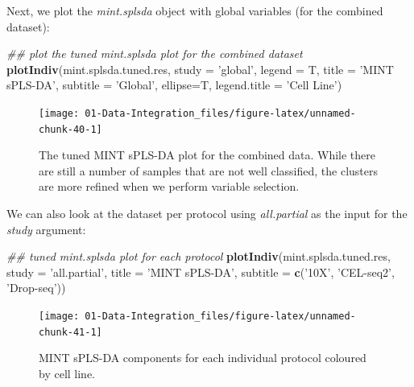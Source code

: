 \documentclass[]{book}
\newenvironment{Shaded}{\begin{snugshade}}{\end{snugshade}}
\newcommand{\CommentTok}[1]{\textcolor[rgb]{0.56,0.35,0.01}{\textit{#1}}}
\newcommand{\DataTypeTok}[1]{\textcolor[rgb]{0.13,0.29,0.53}{#1}}
\newcommand{\KeywordTok}[1]{\textcolor[rgb]{0.13,0.29,0.53}{\textbf{#1}}}
\newcommand{\NormalTok}[1]{#1}
\newcommand{\StringTok}[1]{\textcolor[rgb]{0.31,0.60,0.02}{#1}}
\theoremstyle{definition}
\theoremstyle{definition}
\theoremstyle{definition}
\theoremstyle{remark}
\begin{document}
Next, we plot the \emph{mint.splsda} object with global variables (for
the combined dataset):

\begin{Shaded}
\begin{Highlighting}[]
\CommentTok{## plot the tuned mint.splsda plot for the combined dataset}
\KeywordTok{plotIndiv}\NormalTok{(mint.splsda.tuned.res, }\DataTypeTok{study =} \StringTok{'global'}\NormalTok{, }\DataTypeTok{legend =}\NormalTok{ T,}
          \DataTypeTok{title =} \StringTok{'MINT sPLS-DA'}\NormalTok{,  }\DataTypeTok{subtitle =} \StringTok{'Global'}\NormalTok{, }\DataTypeTok{ellipse=}\NormalTok{T, }\DataTypeTok{legend.title =} \StringTok{'Cell Line'}\NormalTok{)}
\end{Highlighting}
\end{Shaded}

\begin{figure}[ht]

{\centering \texttt{[image: 01-Data-Integration\_files/figure-latex/unnamed-chunk-40-1]} 

}

\caption{The tuned MINT sPLS-DA plot for the combined data. While there are still a number of samples that are not well classified, the clusters are more refined when we perform variable selection.}\label{fig:unnamed-chunk-40}
\end{figure}

We can also look at the dataset per protocol using \emph{all.partial} as
the input for the \emph{study} argument:

\begin{Shaded}
\begin{Highlighting}[]
\CommentTok{## tuned mint.splsda plot for each protocol}
\KeywordTok{plotIndiv}\NormalTok{(mint.splsda.tuned.res, }\DataTypeTok{study =} \StringTok{'all.partial'}\NormalTok{,  }\DataTypeTok{title =} \StringTok{'MINT sPLS-DA'}\NormalTok{, }
          \DataTypeTok{subtitle =} \KeywordTok{c}\NormalTok{(}\StringTok{'10X'}\NormalTok{, }\StringTok{'CEL-seq2'}\NormalTok{, }\StringTok{'Drop-seq'}\NormalTok{))}
\end{Highlighting}
\end{Shaded}

\begin{figure}[ht]

{\centering \texttt{[image: 01-Data-Integration\_files/figure-latex/unnamed-chunk-41-1]} 

}

\caption{MINT sPLS-DA components for each individual protocol coloured by cell line.}\label{fig:unnamed-chunk-41}
\end{figure}
\end{document}
